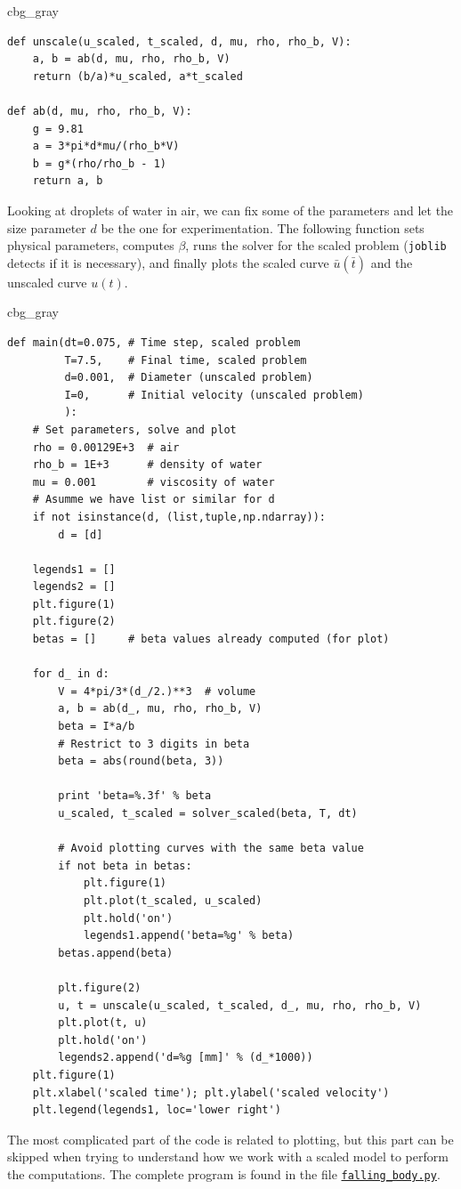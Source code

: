 \documentclass[graybox,envcountchap,sectrefs,final]{svmonodo}
\newenvironment{_cod_tight}[1]{
   \def\FrameCommand{\colorbox{#1}}
   \FrameRule0.6pt\MakeFramed {\FrameRestore}\vskip3mm}
   {\vskip0mm\endMakeFramed}
\newenvironment{cod}[1]{
\bgroup\rmfamily
\fboxsep=0mm\relax
\begin{_cod_tight}{#1}
\list{}{\parsep=-2mm\parskip=0mm\topsep=0pt\leftmargin=2mm
\rightmargin=2\leftmargin\leftmargin=4pt\relax}
\item\relax}
{\endlist\end{_cod_tight}\egroup}
\begin{document}
\begin{cod}{cbg_gray}\begin{Verbatim}[numbers=none,fontsize=\fontsize{9pt}{9pt},baselinestretch=0.95,xleftmargin=2mm]
def unscale(u_scaled, t_scaled, d, mu, rho, rho_b, V):
    a, b = ab(d, mu, rho, rho_b, V)
    return (b/a)*u_scaled, a*t_scaled

def ab(d, mu, rho, rho_b, V):
    g = 9.81
    a = 3*pi*d*mu/(rho_b*V)
    b = g*(rho/rho_b - 1)
    return a, b
\end{Verbatim}
\end{cod}
\noindent

Looking at droplets of water in air, we can fix some of the parameters
and let the size parameter $d$ be the one for experimentation.
The following function sets physical parameters, computes $\beta$,
runs the solver for the scaled problem (\texttt{joblib} detects
if it is necessary), and finally plots the scaled curve
$\bar u(\bar t)$ and the unscaled curve $u(t)$.

\begin{cod}{cbg_gray}\begin{Verbatim}[numbers=none,fontsize=\fontsize{9pt}{9pt},baselinestretch=0.95,xleftmargin=2mm]
def main(dt=0.075, # Time step, scaled problem
         T=7.5,    # Final time, scaled problem
         d=0.001,  # Diameter (unscaled problem)
         I=0,      # Initial velocity (unscaled problem)
         ):
    # Set parameters, solve and plot
    rho = 0.00129E+3  # air
    rho_b = 1E+3      # density of water
    mu = 0.001        # viscosity of water
    # Asumme we have list or similar for d
    if not isinstance(d, (list,tuple,np.ndarray)):
        d = [d]

    legends1 = []
    legends2 = []
    plt.figure(1)
    plt.figure(2)
    betas = []     # beta values already computed (for plot)

    for d_ in d:
        V = 4*pi/3*(d_/2.)**3  # volume
        a, b = ab(d_, mu, rho, rho_b, V)
        beta = I*a/b
        # Restrict to 3 digits in beta
        beta = abs(round(beta, 3))

        print 'beta=%.3f' % beta
        u_scaled, t_scaled = solver_scaled(beta, T, dt)

        # Avoid plotting curves with the same beta value
        if not beta in betas:
            plt.figure(1)
            plt.plot(t_scaled, u_scaled)
            plt.hold('on')
            legends1.append('beta=%g' % beta)
        betas.append(beta)

        plt.figure(2)
        u, t = unscale(u_scaled, t_scaled, d_, mu, rho, rho_b, V)
        plt.plot(t, u)
        plt.hold('on')
        legends2.append('d=%g [mm]' % (d_*1000))
    plt.figure(1)
    plt.xlabel('scaled time'); plt.ylabel('scaled velocity')
    plt.legend(legends1, loc='lower right')
\end{Verbatim}
\end{cod}
\noindent
The most complicated part of the code is related to plotting, but
this part can be skipped when trying to understand how we work with
a scaled model to perform the computations.
The complete program is found in the file
\href{{http://tinyurl.com/o8pb3yy/falling_body.py}}{\nolinkurl{falling_body.py}}.
\end{document}
